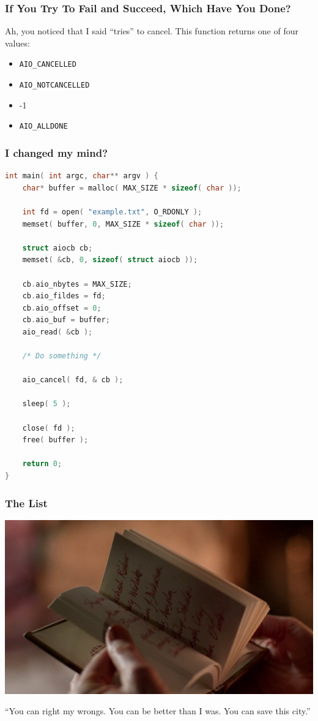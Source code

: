 \begin{frame}
\frametitle{If You Try To Fail and Succeed, Which Have You Done?}

Ah, you noticed that I said ``tries'' to cancel. This function returns one of four values:
\begin{itemize}
	\item \texttt{AIO\_CANCELLED}
	\item \texttt{AIO\_NOTCANCELLED}
	\item -1
	\item \texttt{AIO\_ALLDONE}
\end{itemize}

\end{frame}


\begin{frame}[fragile]
\frametitle{I changed my mind?}

\begin{lstlisting}[language=C]
int main( int argc, char** argv ) {
    char* buffer = malloc( MAX_SIZE * sizeof( char ));

    int fd = open( "example.txt", O_RDONLY );
    memset( buffer, 0, MAX_SIZE * sizeof( char ));

    struct aiocb cb;
    memset( &cb, 0, sizeof( struct aiocb ));

    cb.aio_nbytes = MAX_SIZE;
    cb.aio_fildes = fd;
    cb.aio_offset = 0;
    cb.aio_buf = buffer;
    aio_read( &cb );
    
    /* Do something */
    
    aio_cancel( fd, & cb );

    sleep( 5 );

    close( fd );
    free( buffer );

    return 0;
}
\end{lstlisting}

\end{frame}


\begin{frame}
\frametitle{The List}

\begin{center}
	\includegraphics[width=\textwidth]{images/thelist-arrow.png}
\end{center}

``You can right my wrongs. You can be better than I was. You can save this city.''
\end{frame}


